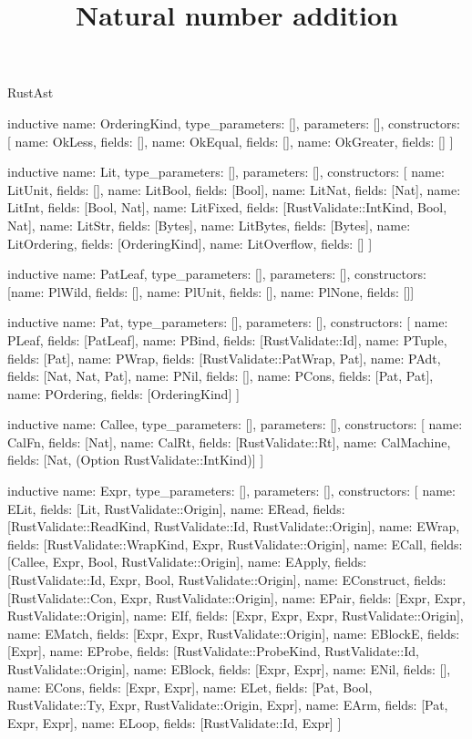 \begin{lexlean}{RustAst}
\title{Natural number addition}
\begin{semanticmodule}
inductive{
  name: OrderingKind,
  type_parameters: [],
  parameters: [],
  constructors: [
    {name: OkLess, fields: []},
    {name: OkEqual, fields: []},
    {name: OkGreater, fields: []}
  ]
}

inductive{
  name: Lit,
  type_parameters: [],
  parameters: [],
  constructors: [
    {name: LitUnit, fields: []},
    {name: LitBool, fields: [Bool]},
    {name: LitNat, fields: [Nat]},
    {name: LitInt, fields: [Bool, Nat]},
    {name: LitFixed, fields: [RustValidate::IntKind, Bool, Nat]},
    {name: LitStr, fields: [Bytes]},
    {name: LitBytes, fields: [Bytes]},
    {name: LitOrdering, fields: [OrderingKind]},
    {name: LitOverflow, fields: []}
  ]
}

inductive{
  name: PatLeaf,
  type_parameters: [],
  parameters: [],
  constructors: [{name: PlWild, fields: []}, {name: PlUnit, fields: []}, {name: PlNone, fields: []}]
}

inductive{
  name: Pat,
  type_parameters: [],
  parameters: [],
  constructors: [
    {name: PLeaf, fields: [PatLeaf]},
    {name: PBind, fields: [RustValidate::Id]},
    {name: PTuple, fields: [Pat]},
    {name: PWrap, fields: [RustValidate::PatWrap, Pat]},
    {name: PAdt, fields: [Nat, Nat, Pat]},
    {name: PNil, fields: []},
    {name: PCons, fields: [Pat, Pat]},
    {name: POrdering, fields: [OrderingKind]}
  ]
}

inductive{
  name: Callee,
  type_parameters: [],
  parameters: [],
  constructors: [
    {name: CalFn, fields: [Nat]},
    {name: CalRt, fields: [RustValidate::Rt]},
    {name: CalMachine, fields: [Nat, (Option RustValidate::IntKind)]}
  ]
}

inductive{
  name: Expr,
  type_parameters: [],
  parameters: [],
  constructors: [
    {name: ELit, fields: [Lit, RustValidate::Origin]},
    {name: ERead, fields: [RustValidate::ReadKind, RustValidate::Id, RustValidate::Origin]},
    {name: EWrap, fields: [RustValidate::WrapKind, Expr, RustValidate::Origin]},
    {name: ECall, fields: [Callee, Expr, Bool, RustValidate::Origin]},
    {name: EApply, fields: [RustValidate::Id, Expr, Bool, RustValidate::Origin]},
    {name: EConstruct, fields: [RustValidate::Con, Expr, RustValidate::Origin]},
    {name: EPair, fields: [Expr, Expr, RustValidate::Origin]},
    {name: EIf, fields: [Expr, Expr, Expr, RustValidate::Origin]},
    {name: EMatch, fields: [Expr, Expr, RustValidate::Origin]},
    {name: EBlockE, fields: [Expr]},
    {name: EProbe, fields: [RustValidate::ProbeKind, RustValidate::Id, RustValidate::Origin]},
    {name: EBlock, fields: [Expr, Expr]},
    {name: ENil, fields: []},
    {name: ECons, fields: [Expr, Expr]},
    {name: ELet, fields: [Pat, Bool, RustValidate::Ty, Expr, RustValidate::Origin, Expr]},
    {name: EArm, fields: [Pat, Expr, Expr]},
    {name: ELoop, fields: [RustValidate::Id, Expr]}
  ]
}


\end{semanticmodule}
\end{lexlean}
